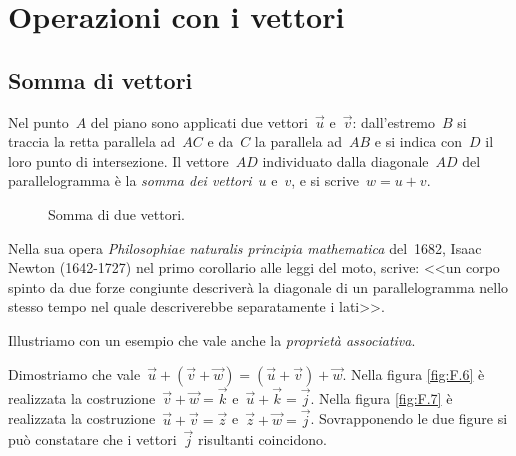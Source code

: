 
\section{Operazioni con i vettori}
\label{sec:vett_operazioni}

\subsection{Somma di vettori}
\begin{definizione}
Nel punto~\(A\) del piano sono applicati due vettori~\(\vec{u}\) e~\(\vec{v}\): 
dall'estremo~\(B\) si
traccia la retta parallela ad~\(AC\) e da~\(C\) la parallela ad~\(AB\) e si indica 
con~\(D\) il loro punto di intersezione.
Il vettore~\(AD\) individuato dalla diagonale~\(AD\) del parallelogramma è la 
\emph{somma dei vettori}~\(u\) e~\(v\), e si scrive~\(w=u+v\).
\end{definizione}


\begin{inaccessibleblock}
 \begin{figure}[h]
\centering

 \caption{Somma di due vettori.}
 \label{fig:vett_somma_parallelogramma}
\end{figure}
\end{inaccessibleblock}

Nella sua opera \emph{Philosophiae naturalis principia mathematica} del~1682, 
Isaac Newton (1642-1727) nel primo corollario alle leggi del moto,
scrive: 
<<un corpo spinto da due forze congiunte descriverà la diagonale di un 
parallelogramma nello stesso tempo nel quale descriverebbe separatamente i 
lati>>.


Illustriamo con un esempio che vale anche la \emph{proprietà associativa}.

\begin{esempio}
Dimostriamo che vale~\(\vec{u}+(\vec{v}+\vec{w})=(\vec{u}+\vec{v})+\vec{w}\).
Nella figura \ref{fig:F.6} è realizzata la 
costruzione~\(\vec{v}+\vec{w}=\vec{k}\) e~\(\vec{u}+\vec{k}=\vec{j}\).
Nella figura \ref{fig:F.7} è realizzata la 
costruzione~\(\vec{u}+\vec{v}=\vec{z}\) e~\(\vec{z}+\vec{w}=\vec{j}\).
Sovrapponendo le due figure si può constatare che i vettori~\(\vec{j}\) 
risultanti coincidono.
\end{esempio}


